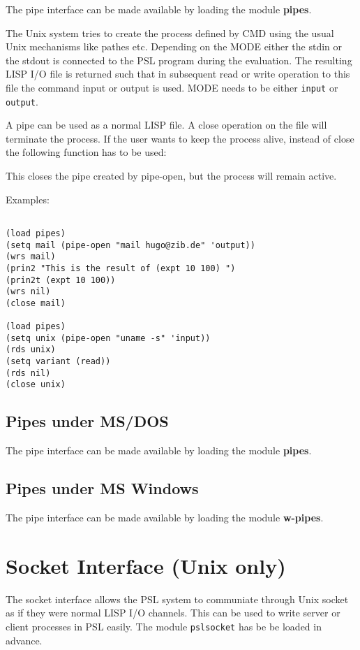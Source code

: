The pipe interface can be made available by loading the module {\bf pipes}.


{The Unix system tries to create the process defined by CMD using the
usual Unix mechanisms like pathes etc.
Depending on the MODE either the stdin or the stdout is connected to
the PSL program during the evaluation. The resulting LISP I/O file
is returned such that in subsequent read or write operation to this file
the command input or output is used. MODE needs to be either {\tt input}
or {\tt output}.}

A pipe can be used as a normal LISP file. A close operation on the file
will terminate the process. If the user wants to keep the process alive,
instead
of close the following function has to be used:

{ This closes the pipe created by pipe-open, but the process will remain
active.}

Examples:
\begin{verbatim}

(load pipes)
(setq mail (pipe-open "mail hugo@zib.de" 'output))
(wrs mail)
(prin2 "This is the result of (expt 10 100) ") 
(prin2t (expt 10 100))
(wrs nil)
(close mail)

(load pipes)
(setq unix (pipe-open "uname -s" 'input))
(rds unix)
(setq variant (read))
(rds nil)
(close unix)
\end{verbatim}

\subsection{Pipes under MS/DOS}

The pipe interface can be made available by loading the module {\bf pipes}.

\subsection{Pipes under MS Windows}

The pipe interface can be made available by loading the module {\bf w-pipes}.

\section{Socket Interface (Unix only)}

The socket interface allows the PSL system to communiate through 
Unix socket as if they were normal LISP I/O channels.
This can be used to write
server or client processes in PSL easily. The module {\tt pslsocket}
has be be loaded in advance.

